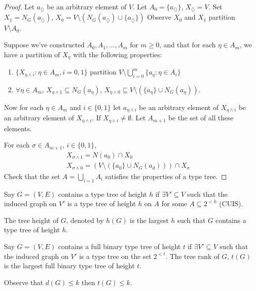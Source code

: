 \documentclass{article}
\begin{document}
\begin{proof}

  Let $a_{\langle \rangle}$ be an arbitrary element of $V$.
  Let $A_0 = \{a_{\langle\rangle}\}$, $X_{\langle\rangle} = V$.
  Set $X_1 = N_G(a_{\langle \rangle})$, $X_0 = V \setminus (N_G(a_{\langle\rangle}) \cup \{a_{\langle\rangle}\})$
  Observe $X_0$ and $X_1$ partition $V \setminus A_0$.

  Suppose we've constructed $A_0, A_1, \dotsc, A_m$ for $m \geq 0$, and that for each $\eta \in A_m$, we have a partition of $X_\eta$ with the following properties:
  \begin{enumerate}
    \item $\{X_{\eta \wedge i}: \eta \in A_m, i=0,1\}$ partition $V \setminus \bigcup_{i=0}^m \{a_\eta : \eta \in A_i\}$
    \item $\forall \eta \in A_m$, $X_{\eta \wedge 1} \subseteq N_G(a_\eta)$, $X_{\eta \wedge 0} \subseteq V \setminus (\{a_\eta\} \cup N_G(a_\eta)).$
  \end{enumerate}

  Now for each $\eta \in A_m$ and $i \in \{0,1\}$ let $a_{\eta \wedge i}$ be an arbitrary element of $X_{\eta \wedge i}$ be an arbitrary element of $X_{\eta \wedge i}$. If $X_{\eta \wedge i} \neq \emptyset$. Let $A_{m+1}$ be the set of all these elements.

  For each $\sigma \in A_{m+1}$, $i \in \{0,1\}$,
  \begin{align*}
    X_{\sigma \wedge 1} = N(a_0) \cap X_0 \\
    X_{\sigma \wedge 0} = (V \setminus (\{a_0\} \cup N_G(a_d))) \cap X_\sigma
  \end{align*}
  Check that the set $A = \bigcup_{i=1} A_i$ satisfies the properties of a type tree.
\end{proof}
\begin{defi}
  Say $G=(V,E)$ contains a type tree of height $h$ if $\exists V' \subseteq V$ such that the induced graph on $V'$ is a type tree of height $h$ on $A$ for some $A \subseteq 2^{<h}$ (CUIS).

  The tree height of $G$, denoted by $h(G)$ is the largest $h$ such that $G$ contains a type tree of height $h$.
\end{defi}
\begin{defi}
  Say $G = (V,E)$ contains a full binary type tree of height $t$ if $\exists V' \subseteq V$ such that the induced graph on $V'$ is a type tree on the set $2^{<t}$.
  The tree rank of $G$, $t(G)$ is the largest full binary type tree of height $t$.
\end{defi}
Observe that $d(G) \leq k$ then $t(G) \leq k$.

\printindex
\end{document}
